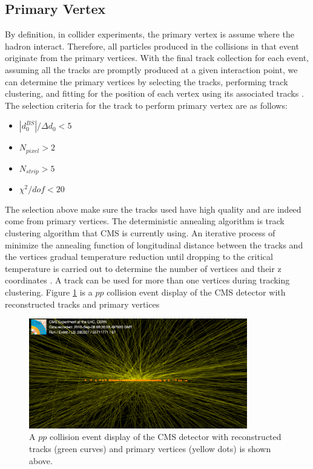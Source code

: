 \subsection{Primary Vertex}

By definition, in collider experiments, the primary vertex is assume where the hadron interact. Therefore, all particles produced in the collisions in that event originate from the primary vertices. With the final track collection for each event, assuming all the tracks are promptly produced at a given interaction point, we can determine the primary vertices by selecting the tracks, performing track clustering, and fitting for the position of each vertex using its associated tracks \cite{CMSTrackComp}. The selection criteria for the track to perform primary vertex are as follows:

\begin{itemize}
\item $|d_0^{BS}|/ \Delta d_0 < 5$
\item $N_{pixel} > 2$
\item $N_{strip} > 5$
\item $\chi^2/dof < 20$
\end{itemize}



The selection above make sure the tracks used have high quality and are indeed come from primary vertices. The deterministic annealing algorithm \cite{DAAlgo} is track clustering algorithm that CMS is currently using. An iterative process of minimize the annealing function of longitudinal distance between the tracks and the vertices gradual temperature reduction until dropping to the critical temperature is carried out to determine the number of vertices and their z coordinates \cite{CMSTrackComp}. A track can be used for more than one vertices during tracking clustering. Figure \ref{CMSEvtDisplay} is a $pp$ collision event display of the CMS detector with reconstructed tracks and primary vertices 

\begin{figure}[hbtp]
\begin{center}
\includegraphics[width=0.85\textwidth]{Figures/Chapter4/CMSEvtDisplay.png}
\caption{A $pp$ collision event display of the CMS detector with reconstructed tracks (green curves) and primary vertices (yellow dots) is shown above.}
\label{CMSEvtDisplay}
\end{center}
\end{figure} 

